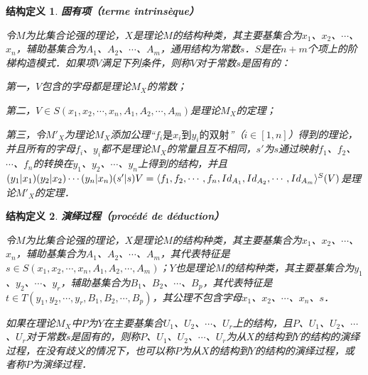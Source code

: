 \documentclass[12pt, a4paper, oneside]{book}
\newtheorem{STdef}{结构定义}
\begin{document}
			\begin{STdef}
				\textbf{固有项（terme intrinsèque）}
				\par
				令$M$为比集合论强的理论，$X$是理论$M$的结构种类，其主要基集合为$x_1$、$x_2$、$\cdots$、$x_n$，辅助基集合为$A_1$、$A_2$、$\cdots$、$A_m$，通用结构为常数$s$．$S$是在$n+m$个项上的阶梯构造模式．如果项$V$满足下列条件，则称$V$对于常数$s$是固有的：
				\par
				第一，$V$包含的字母都是理论$M_X$的常数；
				\par
				第二，$V\in S(x_1, x_2, \cdots, x_n, A_1, A_2, \cdots, A_m)$是理论$M_X$的定理；
				\par
				第三，令${M'}_X$为理论$M_X$添加公理“$f_i\text{是}x_i\text{到}y_i\text{的双射}$”（$i\in [1, n]$）得到的理论，并且所有的字母$f_i$、$y_i$都不是理论$M_X$的常量且互不相同，$s'$为$s$通过映射$f_1$、$f_2$、$\cdots$、$f_n$的转换在$y_1$、$y_2$、$\cdots$、$y_n$上得到的结构，并且$(y_1|x_1)(y_2|x_2)\cdots(y_n|x_n)(s'|s)V=\langle f_1, f_2, \cdots, f_n, \\Id_{A_1}, Id_{A_2}, \cdots, Id_{A_m}\rangle^S(V)$是理论${M'}_X$的定理．
			\end{STdef}
			
			\begin{STdef}
				\textbf{演绎过程（procédé de déduction）}
				\par
				令$M$为比集合论强的理论，$X$是理论$M$的结构种类，其主要基集合为$x_1$、$x_2$、$\cdots$、$x_n$，辅助基集合为$A_1$、$A_2$、$\cdots$、$A_m$，其代表特征是$s\in S(x_1, x_2, \cdots, x_n, A_1, A_2, \cdots, A_m)$；$Y$也是理论$M$的结构种类，其主要基集合为$y_1$、$y_2$、$\cdots$、$y_r$，辅助基集合为$B_1$、$B_2$、$\cdots$、$B_p$，其代表特征是$t\in T(y_1, y_2, \cdots, y_r, B_1, B_2, \cdots, B_p)$，其公理不包含字母$x_1$、$x_2$、$\cdots$、$x_n$、$s$．
				\par
				如果在理论$M_X$中$P$为$Y$在主要基集合$U_1$、$U_2$、$\cdots$、$U_r$上的结构，且$P$、$U_1$、$U_2$、$\cdots$、$U_r$对于常数$s$是固有的，则称$P$、$U_1$、$U_2$、$\cdots$、$U_r$为从$X$的结构到$Y$的结构的演绎过程，在没有歧义的情况下，也可以称$P$为从$X$的结构到$Y$的结构的演绎过程，或者称$P$为演绎过程．
			\end{STdef}
\end{document}
